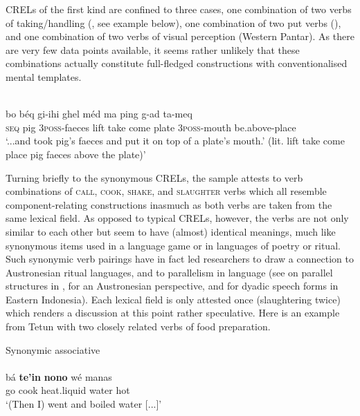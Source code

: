 CRELs of the first kind are confined to three cases, one combination of two verbs of taking/handling (, see example below), one combination of two put verbs (), and one combination of two verbs of visual perception (Western Pantar). As there are very few data points available, it seems rather unlikely that these combinations actually constitute full-fledged constructions with conventionalised mental templates.

\ea 
{}\\
\gll bo béq gi-ihi ghel méd ma ping g-ad ta-meq \\
\textsc{seq} pig \textsc{3}\textsc{poss}-faeces lift take come plate \textsc{3}\textsc{poss}-mouth be.above-place \\
\glft `...and took pig's faeces and put it on top of a plate's mouth.' (lit. lift take come place pig faeces above the plate)'\\ 
\z

Turning briefly to the synonymous CRELs, the sample attests to verb combinations of \textsc{call}, \textsc{cook}, \textsc{shake}, and \textsc{slaughter} verbs which all resemble component-relating constructions inasmuch as both verbs are taken from the same lexical field. As opposed to typical CRELs, however, the verbs are not only similar to each other but seem to have (almost) identical meanings, much like synonymous items used in a language game or in languages of poetry or ritual. Such synonymic verb pairings have in fact led researchers to draw a connection to Austronesian ritual languages, and to parallelism in language (see \citealt{fox1971semantic} on parallel structures in , \citealt{fox2005ritual} for an Austronesian perspective, and \citealt{fox2006speak} for dyadic speech forms in Eastern Indonesia). Each lexical field is only attested once (slaughtering twice) which renders a discussion at this point rather speculative. Here is an example from Tetun with two closely related verbs of food preparation.

\ea Synonymic associative  \\
\\
\gll bá \textbf{te'in} \textbf{nono} wé manas \\
go cook heat.liquid water hot \\
\glft `(Then I) went and boiled water [...]'\\ 
\z

